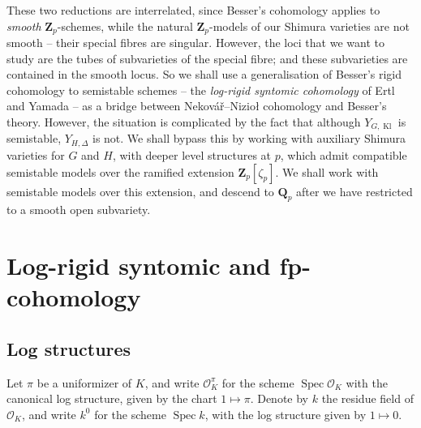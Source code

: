 \documentclass[cjm]{ipart}
\theoremstyle{plain}
\theoremstyle{remark}
\DeclareMathOperator{\Kl}{Kl}
\DeclareMathOperator{\Spec}{Spec}
\newcommand{\Nek}{Nekov\'a\v{r}\xspace}
\newcommand{\Niz}{Nizio\l\xspace}
\newcommand{\QQ}{\mathbf{Q}}
\newcommand{\Qp}{\QQ_p}
\newcommand{\Zp}{\mathbf{Z}_p}
\newcommand{\cO}{\mathcal{O}}
\numberwithin{equation}{subsection}
\begin{document}
 These two reductions are interrelated, since Besser's cohomology applies to \emph{smooth} $\Zp$-schemes, while the natural $\Zp$-models of our Shimura varieties are not smooth -- their special fibres are singular. However, the loci that we want to study are the tubes of subvarieties of the special fibre; and these subvarieties are contained in the smooth locus. So we shall use a generalisation of Besser's rigid cohomology to semistable schemes -- the \emph{log-rigid syntomic cohomology} of Ertl and Yamada \cite{ertlyamada18} -- as a bridge between \Nek--\Niz cohomology and Besser's theory. However, the situation is complicated by the fact that although $Y_{G, \Kl}$ is semistable, $Y_{H, \Delta}$ is not. We shall bypass this by working with auxiliary Shimura varieties for $G$ and $H$, with deeper level structures at $p$, which admit compatible semistable models over the ramified extension $\Zp[\zeta_p]$. We shall work with semistable models over this extension, and descend to $\Qp$ after we have restricted to a smooth open subvariety.



\section{Log-rigid syntomic and fp-cohomology}
\label{sect:logsyntomic}
%



 \subsection{Log structures}

  Let $\pi$ be a uniformizer of $K$, and write $\cO_K^\pi$ for the scheme $\Spec \cO_K$ with the canonical log structure, given by the chart $1 \mapsto \pi$. %
  Denote by $k$ the residue field of $\cO_K$, and write $k^0$ for the scheme $\Spec k$, with the log structure given by $1\mapsto 0$.
\end{document}
